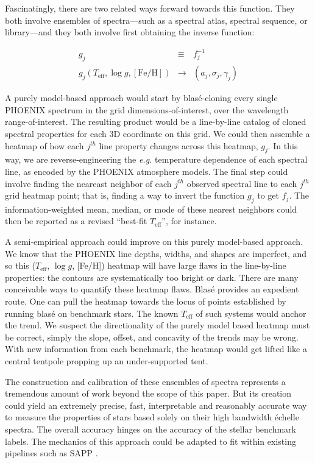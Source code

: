 \documentclass[twocolumn]{aastex631}
\begin{document}
Fascinatingly, there are two related ways forward towards this function.  They both involve ensembles of spectra---such as a spectral atlas, spectral sequence, or library---and they both involve first obtaining the inverse function:

\begin{eqnarray}
    g_j &\equiv& f^{-1}_j\\
    g_j(T_\mathrm{eff}, \log{g}, [\mathrm{Fe}/\mathrm{H}]) &\to& (a_j, \sigma_j, \gamma_j)
\end{eqnarray}

A purely model-based approach would start by blas\'e-cloning every single PHOENIX spectrum in the grid dimensions-of-interest, over the wavelength range-of-interest.  The resulting product would be a line-by-line catalog of cloned spectral properties for each 3D coordinate on this grid.  We could then assemble a heatmap of how each $j^{th}$ line property changes across this heatmap, $g_j$.  In this way, we are reverse-engineering the \emph{e.g.} temperature dependence of each spectral line, as encoded by the PHOENIX atmosphere models.  The final step could involve finding the neareast neighbor of each $j^{th}$ observed spectral line to each $j^{th}$ grid heatmap point; that is, finding a way to invert the function $g_j$ to get $f_j$.  The information-weighted mean, median, or mode of these nearest neighbors could then be reported as a revised ``best-fit $T_\mathrm{eff}$'', for instance.

A semi-empirical approach could improve on this purely model-based approach.  We know that the PHOENIX line depths, widths, and shapes are imperfect, and so this ($T_\mathrm{eff}$, $\log{g}$, [Fe/H]) heatmap will have large flaws in the line-by-line properties: the contours are systematically too bright or dark.  There are many conceivable ways to quantify these heatmap flaws.  Blas\'e provides an expedient route.  One can pull the heatmap towards the locus of points established by running blas\'e on benchmark stars.  The known $T_\mathrm{eff}$ of such systems would anchor the trend.  We suspect the directionality of the purely model based heatmap must be correct, simply the slope, offset, and concavity of the trends may be wrong. With new information from each benchmark, the heatmap would get lifted like a central tentpole propping up an under-supported tent.

The construction and calibration of these ensembles of spectra represents a tremendous amount of work beyond the scope of this paper.  But its creation could yield an extremely precise, fast, interpretable and reasonably accurate way to measure the properties of stars based solely on their high bandwidth \'echelle spectra.  The overall accuracy hinges on the accuracy of the stellar benchmark labels.  The mechanics of this approach could be adapted to fit within existing pipelines such as SAPP \citep{2022A&A...658A.147G}.
\end{document}
